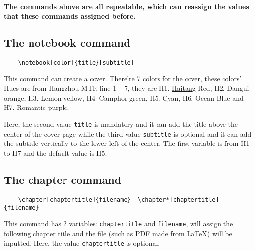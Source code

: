 \documentclass[11pt]{article}
\def\cmd#1{\texorpdfstring{\textcolor{cmdcolor}{\textsf{#1}}}{“#1”}}
\begin{document}
\paragraph{The commands above are all repeatable, which can reassign the values that these commands assigned before.}

\subsection{The \cmd{notebook} command}

\begin{verbatim}
    \notebook[color]{title}[subtitle]
\end{verbatim}

This command can create a cover. There're 7 colors for the cover, these colors' Hues are from Hangzhou MTR line 1 -- 7, they are \textcolor{H1}{H1. \textsf{\href{https://en.wikipedia.org/wiki/Malus_spectabilis}{Haitang} Red}}, \textcolor{H2}{H2. \textsf{Dangui orange}}, \textcolor{H3}{H3. \textsf{Lemon yellow}}, \textcolor{H4}{H4. \textsf{Camphor green}}, \textcolor{H5}{H5. \textsf{Cyan}}, \textcolor{H6}{H6.\textsf{ Ocean Blue}} and \textcolor{H7}{H7. \textsf{Romantic purple}}.

Here, the second value \verb|title| is mandatory and it can add the title above the center of the cover page while the third value \verb|subtitle| is optional and it can add the subtitle vertically to the lower left of the center. The first variable is from \textcolor{H1}{H1} to \textcolor{H7}{H7} and the default value is \textcolor{H5}{H5}.

\subsection{The \cmd{chapter} command}
\begin{verbatim}
    \chapter[chaptertitle]{filename}  \chapter*[chaptertitle]{filename}
\end{verbatim}

This command has 2 variables: \verb|chaptertitle| and \verb|filename|, will assign the following chapter title and the file (such as PDF made from \textsf\LaTeX{}) will be inputted. Here, the value \verb|chaptertitle| is optional.
\end{document}
